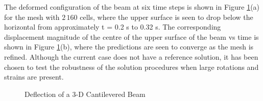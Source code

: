 \documentclass[sn-mathphys,Numbered]{sn-jnl}%
\begin{document}
The deformed configuration of the beam at six time steps is shown in Figure \ref{fig:dynamic_cantilever}(a) for the mesh with $2\,160$ cells, where the upper surface is seen to drop below the horizontal from approximately t = 0.2 s to 0.32 s.
The corresponding displacement magnitude of the centre of the upper surface of the beam vs time is shown in Figure \ref{fig:dynamic_cantilever}(b), where the predictions are seen to converge as the mesh is refined.
Although the current case does not have a reference solution, it has been chosen to test the robustness of the solution procedures when large rotations and strains are present.
\begin{figure}[htbp]
   \centering
	 \quad
   \caption{Deflection of a 3-D Cantilevered Beam}
   \label{fig:dynamic_cantilever}
\end{figure}


\end{document}

